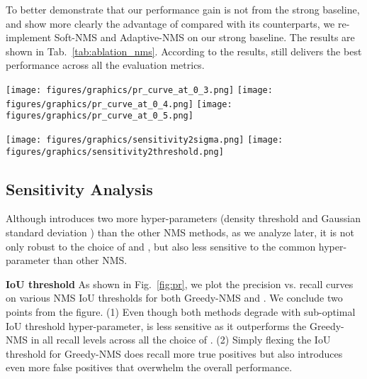 \documentclass[sigconf]{acmart}
\begin{document}
To better demonstrate that our performance gain is not from the strong baseline, and show more clearly the advantage of \nmsname{} compared with its counterparts, we re-implement Soft-NMS and Adaptive-NMS on our strong baseline. The results are shown in Tab.~\ref{tab:ablation_nms}. According to the results, \nmsname{} still delivers the best performance across all the evaluation metrics.

\begin{figure*}
    \texttt{[image: figures/graphics/pr\_curve\_at\_0\_3.png]}
    \texttt{[image: figures/graphics/pr\_curve\_at\_0\_4.png]}
    \texttt{[image: figures/graphics/pr\_curve\_at\_0\_5.png]}
\vspace{-0.2cm}
    \caption{Precision vs. Recall at multiple NMS IoU thresholds  {\normalfont Experiments are conducted on the CrowdHuman validation set and all the NMS methods are implemented by us based on the same baseline.}}
    \label{fig:pr}
\end{figure*} \begin{figure*}
    \vspace{-0.3cm}
\texttt{[image: figures/graphics/sensitivity2sigma.png]}
    \texttt{[image: figures/graphics/sensitivity2threshold.png]}
    \vspace{-0.3cm}
    \caption{Sensitivity to hyper-parameters {\normalfont We show the effect of the different choices of  and  on \nmsname{}. All the experiments are done on the CrowdHuman validation set.} }
    \label{fig:sigma}
\end{figure*} 
\subsection{Sensitivity Analysis}
\label{sec:sensitivity}
Although \nmsname{} introduces two more hyper-parameters (density threshold  and Gaussian standard deviation ) than the other NMS methods, as we analyze later, it is not only robust to the choice of  and , but also less sensitive to the common hyper-parameter  than other NMS.

\textbf{IoU threshold} As shown in Fig.~\ref{fig:pr}, we plot the precision vs. recall curves on various NMS IoU thresholds for both Greedy-NMS and \nmsname{}. We conclude two points from the figure. (1) Even though both methods degrade with sub-optimal IoU threshold hyper-parameter, \nmsname{} is less sensitive as it outperforms the Greedy-NMS in all recall levels across all the choice of . (2) Simply flexing the IoU threshold for Greedy-NMS does recall more true positives but also introduces even more false positives that overwhelm the overall performance.
\end{document}
